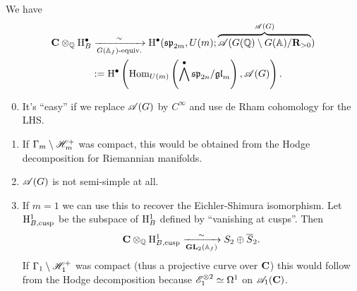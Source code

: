 \begin{theorem}
	We have
	\begin{align*}
		\mathbf{C}\otimes_\mathbb Q \mathrm{H}^{\bullet}_B &\xrightarrow[G(\mathbb{A}_f)\text{-equiv.}]{\sim} \mathrm{H}^{\bullet}( \mathfrak{sp}_{2m}, U(m); \overbrace{\mathscr{A}(G(\mathbb Q) \setminus G(\mathbb{A}) / \mathbf{R}_{>0}}^{\mathscr{A}(G)} )  \\
						 &:= \mathrm{H}^{\bullet} \left( \operatorname{Hom}_{U(m)}\left( \bigwedge^{\bullet}\mathfrak{sp}_{2n} / \mathfrak{gl}_m \right) , \mathscr{A}(G) \right) .
	\end{align*}
\end{theorem}
\begin{remark}\leavevmode
	\begin{enumerate}[1)]
		\setcounter{enumi}{-1}
		\item It's ``easy'' if we replace $\mathscr{A}(G)$ by $C^{\infty}$ and use de Rham cohomology for the LHS.
		\item If $\Gamma_m\setminus \mathscr H_m^{+}$ was compact, this would be obtained from the Hodge decomposition for Riemannian manifolds.
		\item $\mathscr{A}(G)$ is not semi-simple at all.
		\item If $m=1$ we can use this to recover the Eichler-Shimura isomorphism. Let $\mathrm{H}^{1}_{B,\text{cusp}}$ be the subspace of $\mathrm{H}^{1}_B$ defined by ``vanishing at cusps''. Then
			\[
				\mathbf{C}\otimes_\mathbb Q \mathrm{H}^{1}_{B,\text{cusp}} \xrightarrow[\mathbf{GL}_2(\mathbb{A}_f)]{\sim} S_2 \oplus \overline{S}_2.
			\] 
			If $\Gamma_1\setminus\mathscr H_1^{+}$ was compact (thus a projective curve over $\mathbf{C}$) this would follow from the Hodge decomposition because $\mathscr{E}_1^{\otimes 2}\simeq \Omega^{1}$ on $\mathscr{A}_1(\mathbf{C})$.
	\end{enumerate}
\end{remark}
